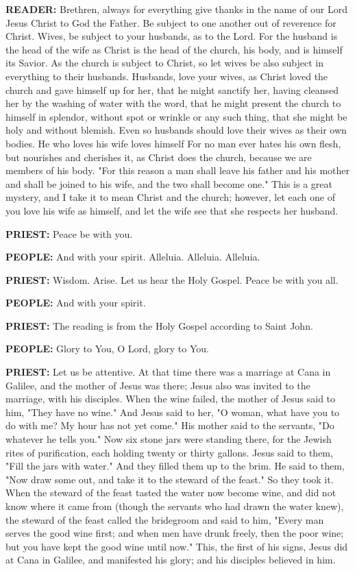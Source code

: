 \textbf{READER:} Brethren, always for everything give thanks in the name
of our Lord Jesus Christ to God the Father. Be subject to one another
out of reverence for Christ. Wives, be subject to your husbands, as to
the Lord. For the husband is the head of the wife as Christ is the head
of the church, his body, and is himself its Savior. As the church is
subject to Christ, so let wives be also subject in everything to their
husbands. Husbands, love your wives, as Christ loved the church and gave
himself up for her, that he might sanctify her, having cleansed her by
the washing of water with the word, that he might present the church to
himself in splendor, without spot or wrinkle or any such thing, that she
might be holy and without blemish. Even so husbands should love their
wives as their own bodies. He who loves his wife loves himself For no
man ever hates his own flesh, but nourishes and cherishes it, as Christ
does the church, because we are members of his body. "For this reason a
man shall leave his father and his mother and shall be joined to his
wife, and the two shall become one." This is a great mystery, and I take
it to mean Christ and the church; however, let each one of you love his
wife as himself, and let the wife see that she respects her husband.

\textbf{PRIEST:} Peace be with you.

\textbf{PEOPLE:} And with your spirit. Alleluia. Alleluia. Alleluia.

\textbf{PRIEST:} Wisdom. Arise. Let us hear the Holy Gospel. Peace be
with you all.

\textbf{PEOPLE:} And with your spirit.

\textbf{PRIEST:} The reading is from the Holy Gospel according to Saint
John.

\textbf{PEOPLE:} Glory to You, O Lord, glory to You.

\textbf{PRIEST:} Let us be attentive. At that time there was a marriage
at Cana in Galilee, and the mother of Jesus was there; Jesus also was
invited to the marriage, with his disciples. When the wine failed, the
mother of Jesus said to him, "They have no wine." And Jesus said to her,
"O woman, what have you to do with me? My hour has not yet come." His
mother said to the servants, "Do whatever he tells you." Now six stone
jars were standing there, for the Jewish rites of purification, each
holding twenty or thirty gallons. Jesus said to them, "Fill the jars
with water." And they filled them up to the brim. He said to them, "Now
draw some out, and take it to the steward of the feast." So they took
it. When the steward of the feast tasted the water now become wine, and
did not know where it came from (though the servants who had drawn the
water knew), the steward of the feast called the bridegroom and said to
him, "Every man serves the good wine first; and when men have drunk
freely, then the poor wine; but you have kept the good wine until now."
This, the first of his signs, Jesus did at Cana in Galilee, and
manifested his glory; and his disciples believed in him.


